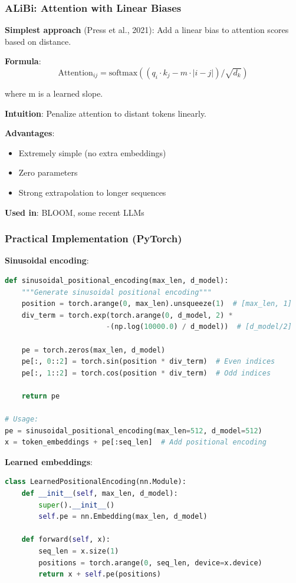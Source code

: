 \subsubsection{ALiBi: Attention with Linear Biases}

\textbf{Simplest approach} (Press et al., 2021): Add a linear bias to attention scores based on distance.

\textbf{Formula}:
\[
\text{Attention}_{ij} = \text{softmax}((q_i \cdot k_j - m \cdot |i-j|) / \sqrt{d_k})
\]

where m is a learned slope.

\textbf{Intuition}: Penalize attention to distant tokens linearly.

\textbf{Advantages}:
\begin{itemize}
\item Extremely simple (no extra embeddings)
\item Zero parameters
\item Strong extrapolation to longer sequences
\end{itemize}

\textbf{Used in}: BLOOM, some recent LLMs

\subsubsection{Practical Implementation (PyTorch)}

\textbf{Sinusoidal encoding}:
\begin{lstlisting}[language=Python]
def sinusoidal_positional_encoding(max_len, d_model):
    """Generate sinusoidal positional encoding"""
    position = torch.arange(0, max_len).unsqueeze(1)  # [max_len, 1]
    div_term = torch.exp(torch.arange(0, d_model, 2) *
                        -(np.log(10000.0) / d_model))  # [d_model/2]

    pe = torch.zeros(max_len, d_model)
    pe[:, 0::2] = torch.sin(position * div_term)  # Even indices
    pe[:, 1::2] = torch.cos(position * div_term)  # Odd indices

    return pe

# Usage:
pe = sinusoidal_positional_encoding(max_len=512, d_model=512)
x = token_embeddings + pe[:seq_len]  # Add positional encoding
\end{lstlisting}

\textbf{Learned embeddings}:
\begin{lstlisting}[language=Python]
class LearnedPositionalEncoding(nn.Module):
    def __init__(self, max_len, d_model):
        super().__init__()
        self.pe = nn.Embedding(max_len, d_model)

    def forward(self, x):
        seq_len = x.size(1)
        positions = torch.arange(0, seq_len, device=x.device)
        return x + self.pe(positions)
\end{lstlisting}

